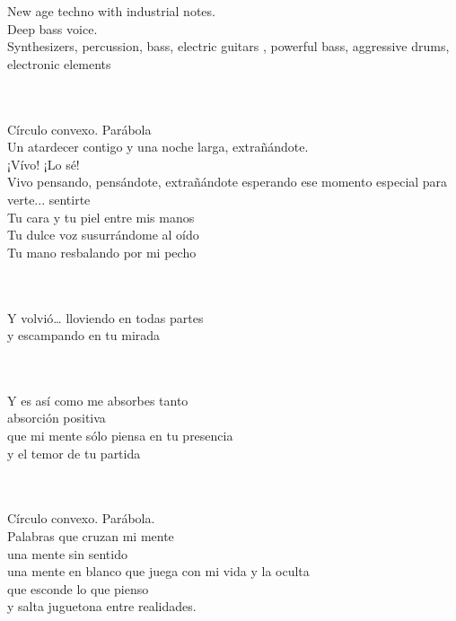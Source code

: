 

\begin{notes}
\end{notes}
\begin{style}
New age techno with industrial notes.\\
Deep bass voice.\\
Synthesizers, percussion, bass, electric guitars , powerful bass, aggressive drums, electronic elements
\end{style}
\begin{lyrics}

\\
\\
Círculo convexo. %
Parábola\\
Un atardecer contigo y una noche larga, extrañándote.\\
¡Vívo! ¡Lo sé!\\
Vivo pensando, pensándote, extrañándote esperando ese momento especial para verte... %
sentirte\\
Tu cara y tu piel entre mis manos\\
Tu dulce voz susurrándome al oído\\
Tu mano resbalando por mi pecho


\\
\\
Y volvió… lloviendo en todas partes\\
y escampando en tu mirada


\\
\\
Y es así como me absorbes tanto\\
absorción positiva\\
que mi mente sólo piensa en tu presencia\\
y el temor de tu partida

\\
\\
Círculo convexo.  Parábola.\\
Palabras que cruzan mi mente\\
una mente sin sentido\\
una mente en blanco que juega con mi vida y la oculta\\
que esconde lo que pienso\\
y salta juguetona entre realidades.


\end{lyrics}
